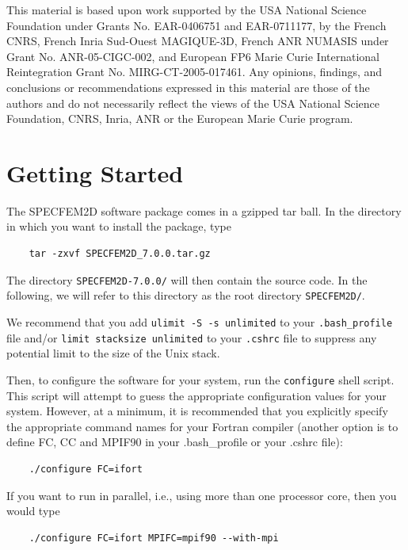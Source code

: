 \documentclass[oneside,english,onecolumn,letterpaper]{book}
\begin{document}
This material is based upon work supported by the USA National Science
Foundation under Grants No. EAR-0406751 and EAR-0711177, by the French
CNRS, French Inria Sud-Ouest MAGIQUE-3D, French ANR NUMASIS under
Grant No. ANR-05-CIGC-002, and European FP6 Marie Curie International
Reintegration Grant No. MIRG-CT-2005-017461.
Any opinions, findings, and conclusions or recommendations expressed in this material are
those of the authors and do not necessarily reflect the views of the
USA National Science Foundation, CNRS, Inria, ANR or the European
Marie Curie program.




\chapter{\label{cha:Getting-Started}Getting Started}


The SPECFEM2D software package comes in a gzipped tar ball. In the
directory in which you want to install the package, type
\begin{verbatim}
    tar -zxvf SPECFEM2D_7.0.0.tar.gz
\end{verbatim}
The directory \texttt{SPECFEM2D-7.0.0/} will then contain
the source code. In the following, we will refer to this directory as the root directory \texttt{SPECFEM2D/}.

We recommend that you add \texttt{ulimit -S -s unlimited} to your \texttt{.bash\_profile} file and/or \texttt{limit stacksize unlimited} to your \texttt{.cshrc} file to suppress any potential limit to the size of the Unix stack.

Then, to configure the software for your system, run the
\texttt{configure} shell script. This script will attempt to guess
the appropriate configuration values for your system. However, at
a minimum, it is recommended that you explicitly specify the appropriate
command names for your Fortran compiler (another option is to define FC, CC and MPIF90 in your .bash\_profile
or your .cshrc file):
%
\begin{verbatim}
    ./configure FC=ifort
\end{verbatim}
%
If you want to run in parallel, i.e., using more than one processor core, then you would type
%
\begin{verbatim}
    ./configure FC=ifort MPIFC=mpif90 --with-mpi
\end{verbatim}
\end{document}
